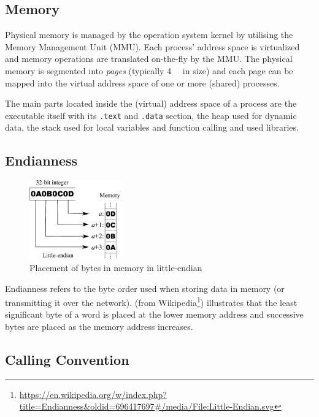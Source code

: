 \documentclass[article]{uibk}
\begin{document}
\subsection{Memory}

Physical memory is managed by the operation system kernel by utilising the
Memory Management Unit (MMU). Each process' address space is virtualized and
memory operations are translated on-the-fly by the MMU. The physical memory is
segmented into \textit{pages} (typically \SI{4}{\kibi\byte} in size) and each
page can be mapped into the virtual address space of one or more (shared)
processes.~\cite[pp.~400]{unix_interals}

The main parts located inside the (virtual) address space of a process are the
executable itself with its \texttt{.text} and \texttt{.data} section, the heap
used for dynamic data, the stack used for local variables and function calling
and used libraries.

\subsection{Endianness}
\label{sub:endianness}

\begin{figure}[t]
    \centering
    \includegraphics[width=0.35\textwidth]{gfx/little_endian.pdf}
    \caption{Placement of bytes in memory in little-endian}
    \label{fig:little_endian}
\end{figure}

Endianness refers to the byte order used when storing data in memory (or
transmitting it over the network).  (from
Wikipedia\footnote{\url{https://en.wikipedia.org/w/index.php?title=Endianness&oldid=696417697\#/media/File:Little-Endian.svg}})
illustrates that the least significant byte of a word is placed at the lower
memory address and successive bytes are placed as the memory address increases.

\subsection{Calling Convention}
\label{sub:calling_convention}
\end{document}
